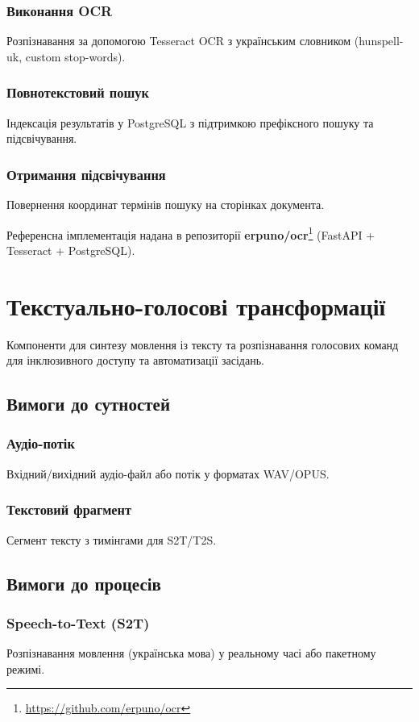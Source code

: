 \documentclass{article}
\begin{document}
\subsubsection{Виконання OCR}
Розпізнавання за допомогою Tesseract OCR з українським словником (hunspell-uk, custom stop-words).

\subsubsection{Повнотекстовий пошук}
Індексація результатів у PostgreSQL з підтримкою префіксного пошуку та підсвічування.

\subsubsection{Отримання підсвічування}
Повернення координат термінів пошуку на сторінках документа.

Референсна імплементація надана в репозиторії \textbf{erpuno/ocr}\footnote{\url{https://github.com/erpuno/ocr}} (FastAPI + Tesseract + PostgreSQL).

\newpage
\section{Текстуально-голосові трансформації}
Компоненти для синтезу мовлення із тексту та розпізнавання голосових команд для інклюзивного доступу та автоматизації засідань.

\subsection{Вимоги до сутностей}
\subsubsection{Аудіо-потік}
Вхідний/вихідний аудіо-файл або потік у форматах WAV/OPUS.

\subsubsection{Текстовий фрагмент}
Сегмент тексту з тимінгами для S2T/T2S.

\subsection{Вимоги до процесів}
\subsubsection{Speech-to-Text (S2T)}
Розпізнавання мовлення (українська мова) у реальному часі або пакетному режимі.
\end{document}
